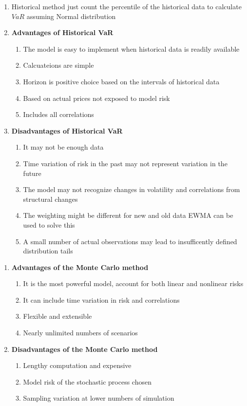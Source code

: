 \documentclass[11pt,fleqn]{report} %
\numberwithin{equation}{section} %
\numberwithin{figure}{section} %
\numberwithin{table}{section} %
\begin{document}
\begin{remark}
\begin{enumerate}
    \item Historical method just count the percentile of the historical data to calculate $VaR$ assuming Normal distribution
    \item \textbf{Advantages of Historical VaR}
    \begin{enumerate}
        \item The model is easy to implement when historical data is readily available
        \item Calcuateions are simple
        \item Horizon is positive choice based on the intervals of historical data
        \item Based on actual prices not exposed to model risk
        \item Includes all correlations
    \end{enumerate}
    \item \textbf{Disadvantages of Historical VaR}
    \begin{enumerate}
        \item It may not be enough data
        \item Time variation of risk in the past may not represent variation in the future
        \item The model may not recognize changes in volatility and correlations from structural changes
        \item The weighting might be different for new and old data EWMA can be used to solve this
        \item A small number of actual observations may lead to insufficently defined distribution tails
    \end{enumerate}
\end{enumerate}
\end{remark}
\begin{remark}
\begin{enumerate}
    \item \textbf{Advantages of the Monte Carlo method}
    \begin{enumerate}
        \item It is the most powerful model, account for both linear and nonlinear risks
        \item It can include time variation in risk and correlations
        \item Flexible and extensible
        \item Nearly unlimited numbers of scenarios
    \end{enumerate}
    \item \textbf{Disadvantages of the Monte Carlo method}
    \begin{enumerate}
        \item Lengthy computation and expensive
        \item Model risk of the stochastic process chosen
        \item Sampling variation at lower numbers of simulation
    \end{enumerate}
\end{enumerate}
\end{remark}
\end{document}

